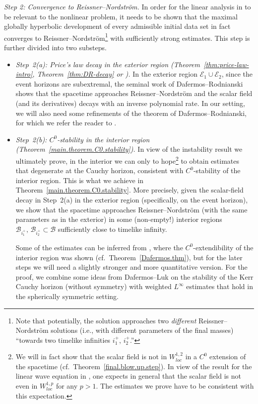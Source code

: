 \documentclass[10pt, reqno]{amsart}
\theoremstyle{definition}
\theoremstyle{remark}
\numberwithin{equation}{section}
\newcommand{\0}{\emptyset}
\newcommand{\pfstep}[1]{\vspace{.5em} {\it \noindent #1.}}
\newcommand{\Int}{\mathscr{B}}
\newcommand{\Ext}{\mathscr{E}}
\begin{document}
\pfstep{Step 2: Convergence to Reissner--Nordstr\"om} In order for the linear analysis in \cite{LO.instab} to be relevant to the nonlinear problem, it needs to be shown that the maximal globally hyperbolic development of every admissible initial data set in fact converges to Reissner--Nordstr\"om\footnote{Note that potentially, the solution approaches two \emph{different} Reissner--Nordstr\"om solutions (i.e., with different parameters of the final masses) ``towards two timelike infinities $i^{+}_{1}$, $i^{+}_{2}$.''} with sufficiently strong estimates. This step is further divided into two substeps. 
\begin{itemize}
\item \pfstep{Step~2(a): Price's law decay in the exterior region \cite{DRPL} (Theorem~\ref{thm:price-law-intro}, Theorem~\ref{thm:DR-decay} or \cite[Section~5]{LO.exterior})} In the exterior region $\Ext_{1} \cup \Ext_{2}$, since the event horizons are subextremal, the seminal work of Dafermos--Rodnianski shows that the spacetime approaches Reissner--Nordstr\"om and the scalar field (and its derivatives) decays with an inverse polynomial rate. In our setting, we will also need some refinements of the theorem of Dafermos--Rodnianski, for which we refer the reader to \cite[Section~5]{LO.exterior}.

\item \pfstep{Step~2(b): $C^0$-stability in the interior region (Theorem~\ref{main.theorem.C0.stability})} In view of the instability result we ultimately prove, in the interior we can only to hope\footnote{We will in fact show that the scalar field is not in $W^{1,2}_{loc}$ in a $C^0$ extension of the spacetime (cf.~Theorem~\ref{final.blow.up.step}). In view of the result for the linear wave equation in \cite{Gleeson}, one expects in general that the scalar field is not even in $W^{1,p}_{loc}$ for any $p>1$. The estimates we prove have to be consistent with this expectation.} to obtain estimates that degenerate at the Cauchy horizon, consistent with $C^0$-stability of the interior region. This is what we achieve in Theorem~\ref{main.theorem.C0.stability}. More precisely, given the scalar-field decay in Step~2(a) in the exterior region (specifically, on the event horizon), we show that the spacetime approaches Reissner--Nordstr\"om (with the same parameters as in the exterior) in some (non-empty!) interior regions $\Int_{i^{+}_{1}}, \, \Int_{i^{+}_{2}} \subset \Int$ sufficiently close to timelike infinity. 

Some of the estimates can be inferred from \cite{D2}, where the $C^0$-extendibility of the interior region was shown (cf.~Theorem~\ref{Dafermos.thm}), but for the later steps we will need a slightly stronger and more quantitative version. For the proof, we combine some ideas from Dafermos--Luk \cite{DL} on the stability of the Kerr Cauchy horizon (without symmetry) with weighted $L^\infty$ estimates that hold in the spherically symmetric setting. 
\end{itemize}
\end{document}
